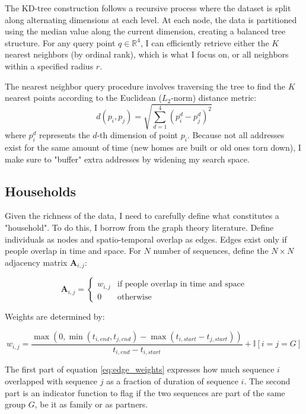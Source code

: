 \documentclass[main.tex]{subfiles}
\begin{document}
The KD-tree construction follows a recursive process where the dataset is split along alternating dimensions at each level. At each node, the data is partitioned using the median value along the current dimension, creating a balanced tree structure.
For any query point $q \in \mathbb{R}^4$, I can efficiently retrieve either the $K$ nearest neighbors (by ordinal rank), which is what I focus on, or all neighbors within a specified radius $r$. 

The nearest neighbor query procedure involves traversing the tree to find the $K$ nearest points according to the Euclidean ($L_2$-norm) distance metric:
\begin{equation}
d(p_i, p_j) = \sqrt{\sum_{d=1}^{4} (p_i^d - p_j^d)^2}
\end{equation}
where $p_i^d$ represents the $d$-th dimension of point $p_i$. Because not all addresses exist for the same amount of time (new homes are built or old ones torn down), I make sure to "buffer" extra addresses by widening my search space. 


\subsection{Households}
Given the richness of the data, I need to carefully define what constitutes a "household". To do this, I borrow from the graph theory literature. Define individuals as nodes and spatio-temporal overlap as edges. Edges exist only if people overlap in time and space. For $N$ number of sequences, define the $N \times N$ adjacency matrix $\mathbf{A}_{i,j}$:

\begin{equation}
    \mathbf{A}_{i,j} = \begin{cases}
        w_{i,j} & \text{if people overlap in time and space} \\
        0 & \text{otherwise}
    \end{cases}
\end{equation}

Weights are determined by:

\begin{equation}
    w_{i, j} = \frac{\max(0 , \min(t_{i,end}, t_{j, end}) -\max(t_{i,start}-t_{j, start}))}{t_{i,end}-t_{i,start}} + \mathbb{I}[i=j=G]
    \label{eq:edge_weights}
\end{equation}

The first part of equation \ref{eq:edge_weights} expresses how much sequence $i$ overlapped with sequence $j$ as a fraction of duration of sequence $i$. The second part is an indicator function to flag if the two sequences are part of the same group $G$, be it as family or as partners.
\end{document}
